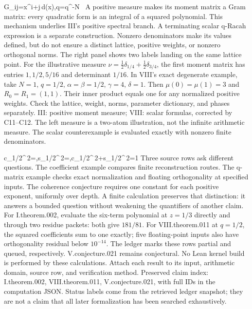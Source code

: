 {G_{ij}=\int x^{i+j}\,d\nu(x),\qquad \gamma q=q^{-N}\ }
{A positive measure makes its moment matrix a Gram matrix: every quadratic form is an integral of a squared polynomial. This mechanism underlies III's positive spectral branch. A terminating scalar q-Racah expression is a separate construction. Nonzero denominators make its values defined, but do not ensure a distinct lattice, positive weights, or nonzero orthogonal norms. The right panel shows two labels landing on the same lattice point.}
{For the illustrative measure $\nu=\tfrac12\delta_{1/4}+\tfrac12\delta_{3/4}$, the first moment matrix has entries $1,1/2,5/16$ and determinant $1/16$. In VIII's exact degenerate example, take $N=1$, $q=1/2$, $\alpha=\beta=1/2$, $\gamma=4$, $\delta=1$. Then $\mu(0)=\mu(1)=3$ and $R_0=R_1=(1,1)$. Their inner product equals one for any normalized positive weights.}
{Check the lattice, weight, norms, parameter dictionary, and phases separately.}
{III: positive moment measure; VIII: scalar formulas, corrected by C11--C12. The left measure is a two-atom illustration, not the infinite arithmetic measure. The scalar counterexample is evaluated exactly with nonzero finite denominators.}

{c_{1/2}^{\,2}=,\qquad s_{1/2}^{\,2}=,\qquad c_{1/2}^{\,2}+s_{1/2}^{\,2}=1}
{Three source rows ask different questions. The coefficient example compares finite reconstruction routes. The q-matrix example checks exact normalization and floating orthogonality at specified inputs. The coherence conjecture requires one constant for each positive exponent, uniformly over depth. A finite calculation preserves that distinction: it answers a bounded question without weakening the quantifiers of another claim.}
{For I.theorem.002, evaluate the six-term polynomial at $z=1/3$ directly and through two residue packets: both give $181/81$. For VIII.theorem.011 at $q=1/2$, the squared coefficients sum to one exactly; five floating-point inputs also have orthogonality residual below $10^{-14}$. The ledger marks these rows partial and queued, respectively. V.conjecture.021 remains conjectural. No Lean kernel build is performed by these calculations.}
{Attach each result to its input, arithmetic domain, source row, and verification method.}
{Preserved claim index: I.theorem.002, VIII.theorem.011, V.conjecture.021, with full IDs in the computation JSON. Status labels come from the retrieved ledger snapshot; they are not a claim that all later formalization has been searched exhaustively.}
